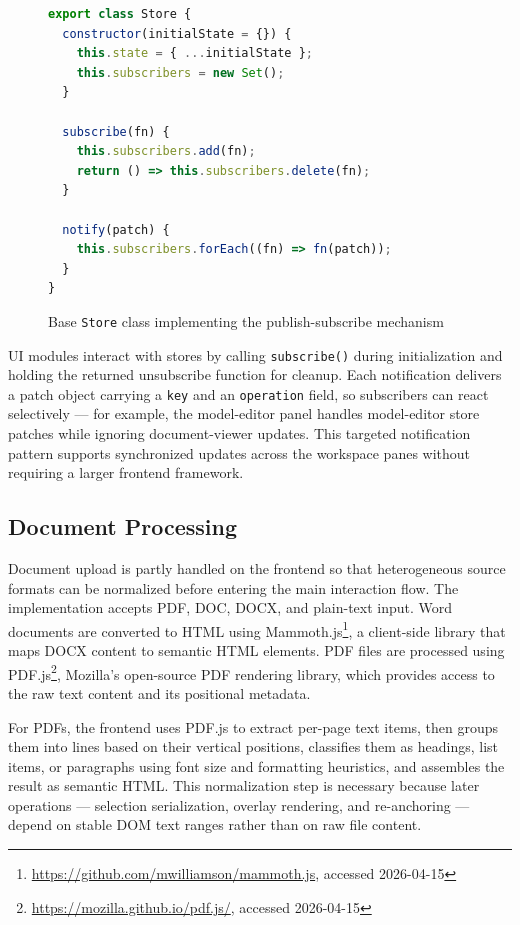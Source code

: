 \begin{figure}[H]
  \centering
  \caption{Base \texttt{Store} class implementing the publish-subscribe mechanism}
  \label{fig:imp_frontend_pubsub_store}
  \begin{lstlisting}[language=JavaScript]
export class Store {
  constructor(initialState = {}) {
    this.state = { ...initialState };
    this.subscribers = new Set();
  }

  subscribe(fn) {
    this.subscribers.add(fn);
    return () => this.subscribers.delete(fn);
  }

  notify(patch) {
    this.subscribers.forEach((fn) => fn(patch));
  }
}
  \end{lstlisting}
\end{figure}

UI modules interact with stores by calling \texttt{subscribe()} during initialization and holding the returned unsubscribe function for cleanup. Each notification delivers a patch object carrying a \texttt{key} and an \texttt{operation} field, so subscribers can react selectively — for example, the model-editor panel handles model-editor store patches while ignoring document-viewer updates. This targeted notification pattern supports synchronized updates across the workspace panes without requiring a larger frontend framework.

\subsection{Document Processing}
Document upload is partly handled on the frontend so that heterogeneous source formats can be normalized before entering the main interaction flow. The implementation accepts PDF, DOC, DOCX, and plain-text input. Word documents are converted to HTML using Mammoth.js\footnote{\url{https://github.com/mwilliamson/mammoth.js}, accessed 2026-04-15}, a client-side library that maps DOCX content to semantic HTML elements. PDF files are processed using PDF.js\footnote{\url{https://mozilla.github.io/pdf.js/}, accessed 2026-04-15}, Mozilla's open-source PDF rendering library, which provides access to the raw text content and its positional metadata.

For PDFs, the frontend uses PDF.js to extract per-page text items, then groups them into lines based on their vertical positions, classifies them as headings, list items, or paragraphs using font size and formatting heuristics, and assembles the result as semantic HTML. This normalization step is necessary because later operations — selection serialization, overlay rendering, and re-anchoring — depend on stable DOM text ranges rather than on raw file content.

